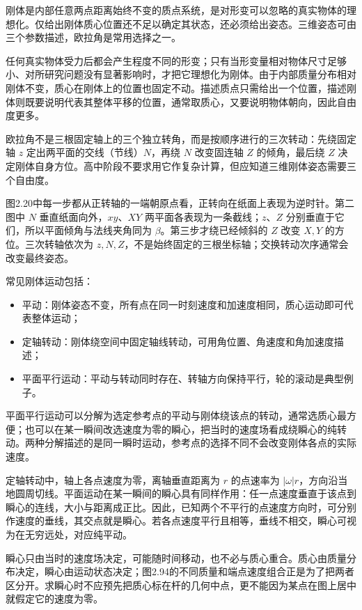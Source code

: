
刚体是内部任意两点距离始终不变的质点系统，是对形变可以忽略的真实物体的理想化。仅给出刚体质心位置还不足以确定其状态，还必须给出姿态。三维姿态可由三个参数描述，欧拉角是常用选择之一。

任何真实物体受力后都会产生程度不同的形变；只有当形变量相对物体尺寸足够小、对所研究问题没有显著影响时，才把它理想化为刚体。由于内部质量分布相对刚体不变，质心在刚体上的位置也固定不动。描述质点只需给出一个位置，描述刚体则既要说明代表其整体平移的位置，通常取质心，又要说明物体朝向，因此自由度更多。

\EulerStepsDiagram

欧拉角不是三根固定轴上的三个独立转角，而是按顺序进行的三次转动：先绕固定轴 $z$ 定出两平面的交线（节线）$N$，再绕 $N$ 改变固连轴 $Z$ 的倾角，最后绕 $Z$ 决定刚体自身方位。高中阶段不要求用它作复杂计算，但应知道三维刚体姿态需要三个自由度。

图2.20中每一步都从正转轴的一端朝原点看，正转向在纸面上表现为逆时针。第二图中 $N$ 垂直纸面向外，$xy$、$XY$ 两平面各表现为一条截线；$z$、$Z$ 分别垂直于它们，所以平面倾角与法线夹角同为 $\beta$。第三步才绕已经倾斜的 $Z$ 改变 $X,Y$ 的方位。三次转轴依次为 $z,N,Z$，不是始终固定的三根坐标轴；交换转动次序通常会改变最终姿态。

常见刚体运动包括：

\begin{itemize}
\item 平动：刚体姿态不变，所有点在同一时刻速度和加速度相同，质心运动即可代表整体运动；
\item 定轴转动：刚体绕空间中固定轴线转动，可用角位置、角速度和角加速度描述；
\item 平面平行运动：平动与转动同时存在、转轴方向保持平行，轮的滚动是典型例子。
\end{itemize}

平面平行运动可以分解为选定参考点的平动与刚体绕该点的转动，通常选质心最方便；也可以在某一瞬间改选速度为零的瞬心，把当时的速度场看成绕瞬心的纯转动。两种分解描述的是同一瞬时运动，参考点的选择不同不会改变刚体各点的实际速度。

定轴转动中，轴上各点速度为零，离轴垂直距离为 $r$ 的点速率为 $|\omega|r$，方向沿当地圆周切线。平面运动在某一瞬间的瞬心具有同样作用：任一点速度垂直于该点到瞬心的连线，大小与距离成正比。因此，已知两个不平行的点速度方向时，可分别作速度的垂线，其交点就是瞬心。若各点速度平行且相等，垂线不相交，瞬心可视为在无穷远处，对应纯平动。

瞬心只由当时的速度场决定，可能随时间移动，也不必与质心重合。质心由质量分布决定，瞬心由运动状态决定；图2.94的不同质量和端点速度组合正是为了把两者区分开。求瞬心时不应预先把质心标在杆的几何中点，更不能因为某点在图上居中就假定它的速度为零。

